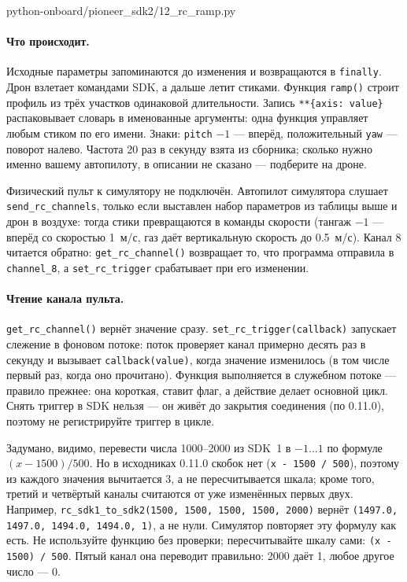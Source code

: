 \begin{codefile}[python]{python-onboard/pioneer_sdk2/12_rc_ramp.py}
\end{codefile}

\paragraph{Что происходит.} Исходные параметры запоминаются до изменения и возвращаются в \verb|finally|. Дрон взлетает командами SDK, а дальше летит стиками. Функция \verb|ramp()| строит профиль из трёх участков одинаковой длительности. Запись \verb|**{axis: value}| распаковывает словарь в именованные аргументы: одна функция управляет любым стиком по его имени. Знаки: \verb|pitch| $-1$ --- вперёд, положительный \verb|yaw| --- поворот налево. Частота 20 раз в секунду взята из сборника; сколько нужно именно вашему автопилоту, в описании не сказано --- подберите на дроне.

\begin{infobox}[RC в симуляторе]
Физический пульт к симулятору не подключён. Автопилот симулятора слушает \verb|send_rc_channels|, только если выставлен набор параметров из таблицы выше и дрон в воздухе: тогда стики превращаются в команды скорости (тангаж $-1$ --- вперёд со скоростью 1~м/с, газ даёт вертикальную скорость до 0.5~м/с). Канал 8 читается обратно: \verb|get_rc_channel()| возвращает то, что программа отправила в \verb|channel_8|, а \verb|set_rc_trigger| срабатывает при его изменении.
\end{infobox}

\paragraph{Чтение канала пульта.} \verb|get_rc_channel()| вернёт значение сразу. \verb|set_rc_trigger(callback)| запускает слежение в фоновом потоке: поток проверяет канал примерно десять раз в секунду и вызывает \verb|callback(value)|, когда значение изменилось (в том числе первый раз, когда оно прочитано). Функция выполняется в служебном потоке --- правило прежнее: она короткая, ставит флаг, а действие делает основной цикл. Снять триггер в SDK нельзя --- он живёт до закрытия соединения (по 0.11.0), поэтому не регистрируйте триггер в цикле.

\begin{warnbox}
Задумано, видимо, перевести числа 1000--2000 из SDK~1 в $-1\ldots1$ по формуле $(x - 1500)/500$. Но в исходниках 0.11.0 скобок нет (\verb|x - 1500 / 500|), поэтому из каждого значения вычитается 3, а не пересчитывается шкала; кроме того, третий и четвёртый каналы считаются от уже изменённых первых двух. Например, \verb|rc_sdk1_to_sdk2(1500, 1500, 1500, 1500, 2000)| вернёт \verb|(1497.0, 1497.0, 1494.0, 1494.0, 1)|, а не нули. Симулятор повторяет эту формулу как есть. Не используйте функцию без проверки; пересчитывайте шкалу сами: \verb|(x - 1500) / 500|. Пятый канал она переводит правильно: 2000 даёт 1, любое другое число --- 0.
\end{warnbox}

